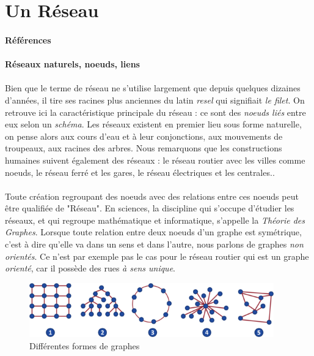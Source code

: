 \section{Un Réseau}
\paragraph{Références} \cite{DarkWeb0}

\paragraph{Réseaux naturels, noeuds, liens}

\paragraph{} Bien que le terme de réseau ne s'utilise largement que depuis quelques dizaines d'années, il tire ses
racines plus anciennes du latin \emph{resel} qui signifiait \emph{le filet}. On retrouve ici la caractéristique
principale du réseau : ce sont des \emph{noeuds liés} entre eux selon un \emph{schéma}. Les réseaux existent en
premier lieu sous forme naturelle, on pense alors aux cours d'eau et à leur conjonctions, aux mouvements de troupeaux,
aux racines des arbres. Nous remarquons que les constructions humaines suivent également des réseaux : le réseau routier
avec les villes comme noeuds, le réseau ferré et les gares, le réseau électriques et les centrales..

\paragraph{} Toute création regroupant des noeuds avec des relations entre ces noeuds peut être qualifiée de "Réseau". En sciences,
la discipline qui s'occupe d'étudier les réseaux, et qui regroupe mathématique et informatique, s'appelle
la \emph{Théorie des Graphes}. Lorsque toute relation entre deux noeuds d'un graphe est symétrique, c'est à dire qu'elle va
dans un sens et dans l'autre, nous parlons de graphes \emph{non orientés}. Ce n'est par exemple pas le cas pour le
réseau routier qui est un graphe \emph{orienté}, car il possède des rues \emph{à sens unique}.

\begin{figure}[h]
    \centering
    \includegraphics[width=400px]{chapters/02/images/reseaux.png}
    \caption{\label{Réseaux, graphes} Différentes formes de graphes}
\end{figure}

